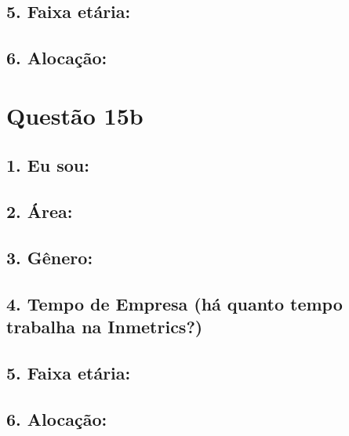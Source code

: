 \documentclass[]{book}
\begin{document}
\hypertarget{faixa-etaria-23}{%
\subsection{5. Faixa etária:}\label{faixa-etaria-23}}

\hypertarget{alocacao-23}{%
\subsection{6. Alocação:}\label{alocacao-23}}

\hypertarget{questao-15b}{%
\section{Questão 15b}\label{questao-15b}}

\hypertarget{eu-sou-24}{%
\subsection{1. Eu sou:}\label{eu-sou-24}}

\hypertarget{area-24}{%
\subsection{2. Área:}\label{area-24}}

\hypertarget{genero-24}{%
\subsection{3. Gênero:}\label{genero-24}}

\hypertarget{tempo-de-empresa-ha-quanto-tempo-trabalha-na-inmetrics-24}{%
\subsection{4. Tempo de Empresa (há quanto tempo trabalha na Inmetrics?)}\label{tempo-de-empresa-ha-quanto-tempo-trabalha-na-inmetrics-24}}

\hypertarget{faixa-etaria-24}{%
\subsection{5. Faixa etária:}\label{faixa-etaria-24}}

\hypertarget{alocacao-24}{%
\subsection{6. Alocação:}\label{alocacao-24}}
\end{document}
